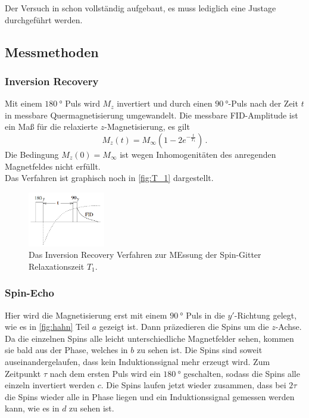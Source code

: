         \noindent Der Versuch in schon vollständig aufgebaut, es muss lediglich eine Justage durchgeführt werden. 

    \subsection{Messmethoden}
    \label{sec:Messmethoden}

    \subsubsection{Inversion Recovery}

        Mit einem $\SI{180}{\degree}$ Puls wird $M_z$ invertiert und durch einen $\SI{90}{\degree}$-Puls nach der Zeit $t$ 
        in messbare Quermagnetisierung umgewandelt. Die messbare FID-Amplitude ist ein Maß für die relaxierte $z$-Magnetisierung, es gilt 
        \begin{equation*}
            M_z(t) = M_\infty \left(1 - 2e^{-\frac{t}{T_1}}\right)\, .
        \end{equation*}
        Die Bedingung $M_z(0) = M_\infty$ ist wegen Inhomogenitäten des anregenden Magnetfeldes nicht erfüllt. \\
        Das Verfahren ist graphisch noch in \autoref{fig:T_1} dargestellt. 

        \begin{figure}%
            \centering%
            \includegraphics[width=0.3\textwidth]{images/t_1_messung.png}%
            \caption{Das Inversion Recovery Verfahren zur MEssung der Spin-Gitter Relaxationszeit $T_1$. \cite{grundlagen}}%
            \label{fig:T_1}%
        \end{figure}%

    \subsubsection{Spin-Echo}

        \noindent Hier wird die Magnetisierung erst mit einem $\SI{90}{\degree}$ Puls in die $y'$-Richtung gelegt, wie es in \autoref{fig:hahn} Teil \(a\) gezeigt ist. Dann präzedieren die Spins 
        um die $z$-Achse. Da die einzelnen Spins alle leicht unterschiedliche Magnetfelder sehen, kommen sie bald aus der Phase, welches in \(b\) zu sehen ist. Die Spins sind soweit auseinandergelaufen, 
        dass kein Induktionssignal mehr erzeugt wird. Zum Zeitpunkt $\tau$ nach dem ersten Puls wird ein $\SI{180}{\degree}$ geschalten, sodass die Spins alle einzeln invertiert werden \(c\). 
        Die Spins laufen jetzt wieder zusammen, dass bei $2 \tau$ die Spins wieder alle in Phase liegen und ein Induktionssignal gemessen werden kann, wie es in \(d\) zu sehen ist.  

